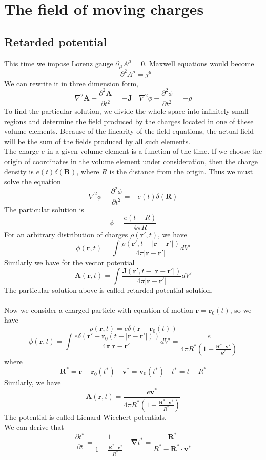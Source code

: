 \section{The field of moving charges}
\subsection{Retarded potential}
This time we impose Lorenz gauge $\partial_{\mu} A^{\mu} = 0$. Maxwell equations would become
\[-\partial^2 A^{\mu} = j^{\mu}\]
We can rewrite it in three dimension form,
\[\nabla^2 \bm{A} - \frac{\partial^2 \bm{A}}{\partial t^2} = -\bm{J} \quad \nabla^2 \phi - \frac{\partial^2\phi}{\partial t^2} = -\rho\]
To find the particular solution, we divide the whole space into infinitely small regions and determine the field produced by the charges located in one of these volume elements. Because of the linearity of the field equations, the actual field will be the sum of the fields produced by all such elements. \\
The charge $e$ in a given volume element is a function of the time. If we choose the origin of coordinates in the volume element under consideration, then the charge density is $e(t)\delta(\bm{R})$, where $R$ is the distance from the origin. Thus we must solve the equation
\[\nabla^2 \phi - \frac{\partial^2\phi}{\partial t^2} = -e(t)\delta(\bm{R})\]
The particular solution is
\[\phi = \frac{e(t-R)}{4\pi R}\]
For an arbitrary distribution of charges $\rho(\bm{r}',t)$, we have
\[\phi(\bm{r},t) = \int \frac{\rho(\bm{r}',t-|\bm{r}-\bm{r}'|)}{4\pi |\bm{r}-\bm{r}'|} dV'\]
Similarly we have for the vector potential
\[\bm{A}(\bm{r},t) = \int \frac{\bm{J}(\bm{r}',t-|\bm{r}-\bm{r}'|)}{4\pi |\bm{r}-\bm{r}'|} dV'\]
The particular solution above is called retarded potential solution.
\\ \\
Now we consider a charged particle with equation of motion $\bm{r} = \bm{r}_0(t)$, so we have
\[\rho(\bm{r},t) = e\delta(\bm{r}-\bm{r}_0(t))\]
\[\phi(\bm{r},t) = \int \frac{e \delta (\bm{r}'-\bm{r}_0(t-|\bm{r}-\bm{r}'|))}{4\pi |\bm{r}-\bm{r}'|} dV' = \frac{e}{4\pi R^* (1 - \frac{\bm{R}^* \cdot \bm{v}^*}{R^*})}\]
where 
\[\bm{R}^* = \bm{r} - \bm{r}_0(t^*) \quad \bm{v}^* = \bm{v}_0(t^*) \quad t^* = t - R^*\]
Similarly, we have
\[\bm{A}(\bm{r},t) = \frac{e\bm{v}^*}{4\pi R^* (1 - \frac{\bm{R}^* \cdot \bm{v}^*}{R^*})}\]
The potential is called Lienard-Wiechert potentials.\\
We can derive that
\[\frac{\partial t^*}{\partial t} = \frac{1}{1- \frac{\bm{R}^* \cdot \bm{v}^*}{R^*}} \quad \bm{\nabla} t^* = \frac{\bm{R}^*}{R^* - \bm{R}^* \cdot \bm{v}^*}\]
